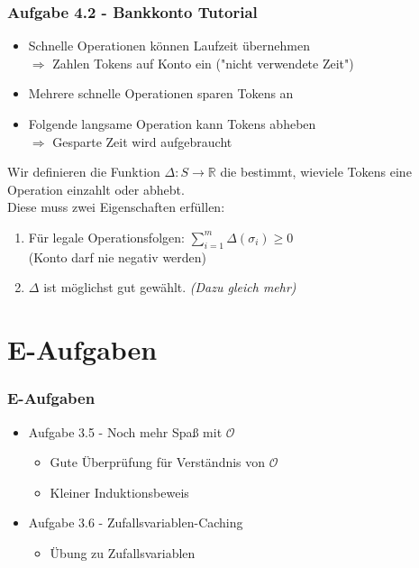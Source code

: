 \documentclass{beamer}
\begin{document}
\begin{frame}[t]
	\frametitle{Aufgabe 4.2 - Bankkonto Tutorial}

	\begin{itemize}
		\item Schnelle Operationen können Laufzeit übernehmen \\
		      $\Rightarrow$ Zahlen Tokens auf Konto ein ("nicht verwendete Zeit")
		\item Mehrere schnelle Operationen sparen Tokens an
		\item Folgende langsame Operation kann Tokens abheben \\
		      $\Rightarrow$ Gesparte Zeit wird aufgebraucht
	\end{itemize}

	\bigskip

	Wir definieren die Funktion $\Delta: S \to \mathbb{R}$ die bestimmt, wieviele Tokens eine Operation einzahlt oder abhebt. \\
	Diese muss zwei Eigenschaften erfüllen:

	\medskip

	\begin{enumerate}
		\item Für legale Operationsfolgen: $\sum_{i=1}^{m} \Delta(\sigma_i) \geq 0$ \\
		      (Konto darf nie negativ werden)
		\item $\Delta$ ist möglichst gut gewählt. \textit{(Dazu gleich mehr)}
	\end{enumerate}
\end{frame}

\begin{frame}

\end{frame}

\section{E-Aufgaben}
\begin{frame}
	\frametitle{E-Aufgaben}
	\begin{itemize}
		\item Aufgabe 3.5 - Noch mehr Spaß mit $\mathcal{O}$ \\
		      \begin{itemize}
			      \item Gute Überprüfung für Verständnis von $\mathcal{O}$
			      \item Kleiner Induktionsbeweis
		      \end{itemize}
		\item Aufgabe 3.6 - Zufallsvariablen-Caching
		      \begin{itemize}
			      \item Übung zu Zufallsvariablen
		      \end{itemize}
	\end{itemize}
\end{frame}
\end{document}
